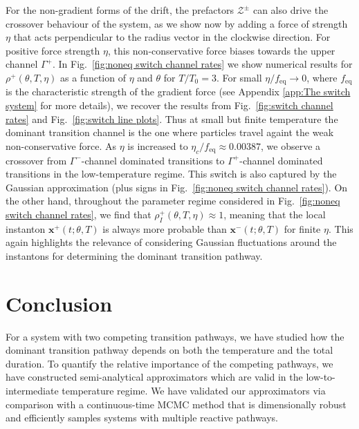 For the non-gradient forms of the drift, the prefactors $\mathcal{Z^{\pm}}$
can also drive the crossover behaviour of the system, as we show now
by adding a force of strength $\eta$ that acts perpendicular to the
radius vector in the clockwise direction. For positive force strength
$\eta$, this non-conservative force biases towards the upper channel
$\Gamma^{+}$. In Fig.~\ref{fig:noneq switch channel rates} we show numerical
results for $\rho^{+}(\theta,T,\eta)$ as a function of $\eta$ and $\theta$
for $T/T_{0}=3$. For small $\eta/f_{\text{eq}}\rightarrow0$, where
$f_{\text{eq}}$ is the characteristic strength of the gradient force
(see Appendix \ref{app:The switch system} for more details), we recover the results from Fig.~\ref{fig:switch channel rates} and Fig.~\ref{fig:switch line plots}. Thus at small but finite temperature the dominant transition
channel is the one where particles travel againt the weak non-conservative
force. As $\eta$ is increased to $\eta_{c}/f_{\text{eq}}\approx0.00387$,
we observe a crossover from $\Gamma^{-}$-channel dominated transitions
to $\Gamma^{+}$-channel dominated transitions in the low-temperature
regime. This switch is also captured by the Gaussian approximation
(plus signs in Fig.~\ref{fig:noneq switch channel rates}). On the other hand,
throughout the parameter regime considered in Fig.~\ref{fig:noneq switch channel rates},
we find that $\rho_{I}^{+}(\theta,T,\eta)\approx1$, meaning that the
local instanton $\mathbf{x}^{+}(t;\theta,T)$ is always more probable than $\mathbf{x}^{-}(t;\theta,T)$ for finite $\eta$. This again highlights the relevance of considering Gaussian fluctuations around the instantons for determining the dominant
transition pathway.

\section{Conclusion}

For a system with two competing transition pathways,
we have studied how the dominant transition pathway depends on both
the temperature and the total duration. To quantify the relative importance
of the competing pathways, we have constructed semi-analytical approximators
which are valid in the low-to-intermediate temperature regime. We
have validated our approximators via comparison with a continuous-time
MCMC method that is dimensionally robust and efficiently samples systems
with multiple reactive pathways.


